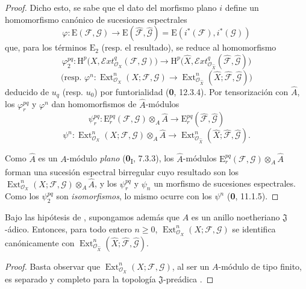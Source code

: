 \begin{proof}
Dicho esto, se sabe que el dato del morfismo plano $i$ define un
homomorfismo canónico de sucesiones espectrales
\[
\varphi:\mathrm E(\mathcal F,\mathcal G)\longrightarrow
\mathrm E(\widehat{\mathcal F},\widehat{\mathcal G})
=\mathrm E(i^*(\mathcal F),i^*(\mathcal G))
\]
que, para los términos $\mathrm E_2$ (resp. el resultado), se reduce al
homomorfismo
\[
\varphi_2^{pq}:\mathrm H^p\bigl(X,
\mathcal{E}\!xt^q_{\mathcal O_X}(\mathcal F,\mathcal G)\bigr)
\longrightarrow
\mathrm H^p\bigl(\widehat X,
\mathcal{E}\!xt^q_{\mathcal O_{\widehat X}}
(\widehat{\mathcal F},\widehat{\mathcal G})\bigr)
\]
\[
\text{(resp. }\varphi^n:\operatorname{Ext}^n_{\mathcal O_X}
(X;\mathcal F,\mathcal G)\longrightarrow
\operatorname{Ext}^n_{\mathcal O_{\widehat X}}
(\widehat X;\widehat{\mathcal F},\widehat{\mathcal G})\text{)}
\]
deducido de $u_q$ (resp. $u_0$) por funtorialidad (\textbf{0}, 12.3.4). Por
tensorización con $\widehat A$, los $\varphi_r^{pq}$ y $\varphi^n$ dan
homomorfismos de $\widehat A$-módulos
\[
\psi_r^{pq}:\mathrm E_r^{pq}(\mathcal F,\mathcal G)
\otimes_A\widehat A\longrightarrow
\mathrm E_r^{pq}(\widehat{\mathcal F},\widehat{\mathcal G})
\]
\[
\psi^n:\operatorname{Ext}^n_{\mathcal O_X}(X;\mathcal F,\mathcal G)
\otimes_A\widehat A\longrightarrow
\operatorname{Ext}^n_{\mathcal O_{\widehat X}}
(\widehat X;\widehat{\mathcal F},\widehat{\mathcal G}).
\]

Como $\widehat A$ es un $A$-módulo \emph{plano} (\textbf{0}\textsubscript{I}, 7.3.3), los
$\widehat A$-módulos
$\mathrm E_r^{pq}(\mathcal F,\mathcal G)\otimes_A\widehat A$ forman una
sucesión espectral birregular cuyo resultado son los
$\operatorname{Ext}^n_{\mathcal O_X}(X;\mathcal F,\mathcal G)\otimes_A\widehat A$, y los
$\psi_r^{pq}$ y $\psi_n$ un morfismo de sucesiones espectrales. Como los
$\psi_2^{pq}$ son \emph{isomorfismos}, lo mismo ocurre con los $\psi^n$
(\textbf{0}, 11.1.5).
\end{proof}

\begin{corollary}[4.5.2]
\label{III.4.5.2}
\label{III.4.5.2-fr}
Bajo las hipótesis de , supongamos además que $A$ es
un anillo noetheriano $\mathfrak J$-ádico. Entonces, para todo entero
$n\geq0$, $\operatorname{Ext}^n_{\mathcal O_X}(X;\mathcal F,\mathcal G)$
se identifica canónicamente con
$\operatorname{Ext}^n_{\mathcal O_{\widehat X}}
(\widehat X;\widehat{\mathcal F},\widehat{\mathcal G})$.
\end{corollary}

\begin{proof}
Basta observar que $\operatorname{Ext}^n_{\mathcal O_X}
(X;\mathcal F,\mathcal G)$, al ser un $A$-módulo de tipo finito, es separado y
completo para la topología $\mathfrak J$-preádica .
\end{proof}

